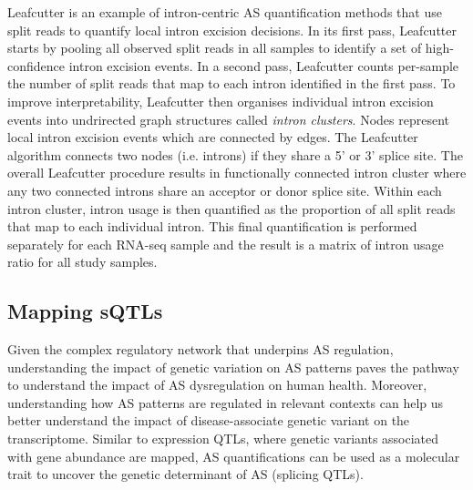 Leafcutter is an example of intron-centric AS quantification methods that use split reads to quantify local intron excision decisions. In its first pass, Leafcutter starts by pooling all observed split reads in all samples to identify a set of high-confidence intron excision events. In a second pass, Leafcutter counts per-sample the number of split reads that map to each intron identified in the first pass. To improve interpretability, Leafcutter then organises individual intron excision events into undrirected graph structures called \textit{intron clusters}. Nodes represent local intron excision events which are connected by edges. The Leafcutter algorithm connects two nodes (i.e. introns) if they share a 5' or 3' splice site. The overall Leafcutter procedure results in functionally connected intron cluster where any two connected introns share an acceptor or donor splice site. Within each intron cluster, intron usage is then quantified as the proportion of all split reads that map to each individual intron. This final quantification is performed separately for each RNA-seq sample and the result is a matrix of intron usage ratio for all study samples. 



\subsection{Mapping sQTLs}

Given the complex regulatory network that underpins AS regulation, understanding the impact of genetic variation on AS patterns paves the pathway to understand the impact of AS dysregulation on human health. Moreover, understanding how AS patterns are regulated in relevant contexts can help us better understand the impact of disease-associate genetic variant on the transcriptome. Similar to expression QTLs, where genetic variants associated with gene abundance are mapped, AS quantifications can be used as a molecular trait to uncover the genetic determinant of AS (splicing QTLs).\\


